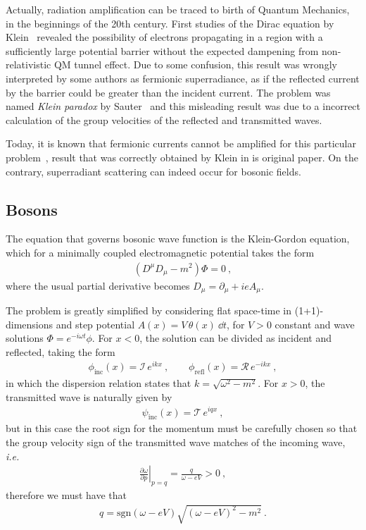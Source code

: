 Actually, radiation amplification can be traced to birth of Quantum Mechanics, in the beginnings of the 20th century. 
First studies of the Dirac equation by Klein~\cite{Klein1929} revealed the possibility of electrons propagating in a region with a sufficiently large potential barrier without the expected dampening from non-relativistic QM tunnel effect.
Due to some confusion, this result was wrongly interpreted by some authors as fermionic superradiance, as if the reflected current by the barrier could be greater than the incident current. 
The problem was named \emph{Klein paradox} by Sauter~\cite{Sauter1931} and this misleading result was due to a incorrect calculation of the group velocities of the reflected and transmitted waves. 

Today, it is known that fermionic currents cannot be amplified for this particular problem~\cite{Manogue1988}, result that was correctly obtained by Klein in is original paper. 
On the contrary, superradiant scattering can indeed occur for bosonic fields.

\subsection{Bosons}

The equation that governs bosonic wave function is the Klein-Gordon equation, which for a minimally coupled electromagnetic potential takes the form
\begin{align}
    (D^\mu D_\mu - m^2) \Phi = 0 ~,
\end{align}
where the usual partial derivative becomes $D_\mu = \partial_\mu + i e A_\mu$. 

The problem is greatly simplified by considering flat space-time in (1+1)-dimensions and step potential $A(x) = V\,\theta(x) ~\dd t$, for $V>0$ constant and wave solutions $\Phi= e^{-i \omega t} \phi$.
For $x<0$, the solution can be divided as incident and reflected, taking the form
\begin{align}
    \phi_\mathrm{inc}(x) = \mathcal{I}\, e^{i k x}  ~, \qquad
    \phi_\mathrm{refl}(x) = \mathcal{R}\, e^{- i k x} ~,
\end{align}
in which the dispersion relation states that $k=\sqrt{\omega^2-m^2}$. For $x>0$, the transmitted wave is naturally given by 
\begin{align}
    \psi_\mathrm{inc}(x) = \mathcal{T}\, e^{i q x}  ~,
\end{align}
but in this case the root sign for the momentum must be carefully chosen so that the group velocity sign of the transmitted wave matches of the incoming wave, \textit{i.e.}
\begin{align}
    \left.\frac{\partial \omega}{\partial p}\right|_{p=q} = \frac{q}{\omega - e V} > 0 ~,
\end{align}
therefore we must have that
\begin{align}
    q = \mathrm{sgn}(\omega - e V) \sqrt{ (\omega - e V)^2 - m^2 } ~.
\end{align}

